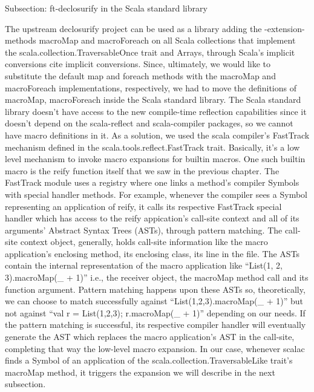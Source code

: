 Subsection: ft-declosurify in the Scala standard library

The upstream declosurify project can be used as a library adding the -extension-
methods macroMap and macroForeach on all Scala collections that implement the
scala.collection.TraversableOnce trait and Arrays, through Scala's implicit
conversions {cite implicit conversions}. Since, ultimately, we would like to
substitute the default map and foreach methods with the macroMap and
macroForeach implementations, respectively, we had to move the definitions
of macroMap, macroForeach inside the Scala standard library. The Scala standard
library doesn't have access to the new compile-time reflection capabilities
since it doesn't depend on the scala-reflect and scala-compiler packages, so we
cannot have macro definitions in it. As a solution, we used the scala compiler's
FastTrack mechanism defined in the scala.tools.reflect.FastTrack trait.
Basically, it's a low level mechanism to invoke macro expansions for builtin
macros. One such builtin macro is the reify function itself that we saw in
the previous chapter. The FastTrack module uses a registry where one links a
method's compiler Symbols with special handler methods. For example, whenever
the compiler sees a Symbol representing an application of reify, it calls its
respective FastTrack special handler which has access to the reify appication's
call-site context and all of  its arguments' Abstract Syntax Trees (ASTs),
through pattern matching. The call-site context object, generally, holds
call-site information like the macro application's enclosing method, its
enclosing class, its line in the file. The ASTs contain the internal
representation of the macro application like ``List(1, 2, 3).macroMap(_ + 1)''
i.e., the receiver object, the macroMap method call and its function argument.
Pattern matching happens upon these ASTs so, theoretically, we can choose to
match successfully against ``List(1,2,3).macroMap(_ + 1)'' but not against ``val
r = List(1,2,3); r.macroMap(_ + 1)'' depending on our needs. If the pattern
matching is successful, its respective compiler handler will eventually generate
the AST which replaces the macro application's AST in the call-site, completing
that way the low-level macro expansion. In our case, whenever scalac finds a
Symbol of an application of the scala.collection.TraversableLike trait's
macroMap method, it triggers the expansion we will describe in the next
subsection.

